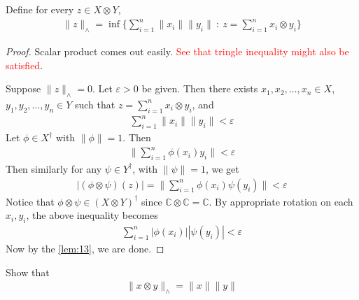 \begin{definition}
  Define for every $z \in X \otimes Y$,
  \begin{align*}
    \|z\|_{\wedge} = \inf \Big \{ \sum_{i = 1}^{n} \|x_i\|\|y_i\| \ : \  z =
    \sum_{i = 1}^{n} x_i \otimes y_i \Big \}
  \end{align*}
\end{definition}
\begin{proof}
  Scalar product comes out easily. \textcolor{red}{See that tringle
  inequality might also be satisfied}.

  Suppose $\|z\|_{\wedge} = 0$. Let $ \varepsilon > 0$ be given. Then there
  exists $x_1 , x_2 , \ldots , x_n \in X$, $y_1 , y_2 , \ldots , y_n
  \in Y$ such that $z = \sum_{i = 1}^{n} x_i \otimes y_i$, and
  \begin{align*}
    \sum_{i = 1}^{n} \|x_i\|\|y_i\| < \varepsilon
  \end{align*}
  Let $\phi \in X^\dagger$ with $\|\phi\| = 1$. Then
  \begin{align*}
    \Big \| \sum_{i = 1}^{n} \phi(x_i) y_i \Big \| < \varepsilon
  \end{align*}
  Then similarly for any $\psi \in Y^\dagger$, with $\|\psi\| = 1$, we get
  \begin{align*}
    \big|(\phi \otimes \psi)(z)\big| = \Big \|\sum_{i = 1}^{n}
    \phi(x_i) \psi(y_i) \Big \| < \varepsilon
  \end{align*}
  Notice that $\phi \otimes \psi \in (X \otimes Y)^\dagger$ since
  $\mathbb{C} \otimes \mathbb{C} = \mathbb{C}$.
  By appropriate rotation on each $x_i, y_i$, the above inequality becomes
  \begin{align*}
    \sum_{i = 1}^{n} |\phi(x_i)||\psi(y_i)| < \varepsilon
  \end{align*}
  Now by the \autoref{lem:13}, we are done.
\end{proof}

\begin{exercise}
  Show that
  \begin{align*}
    \|x \otimes y\|_{\wedge} = \|x\|\|y\|
  \end{align*}
\end{exercise}
